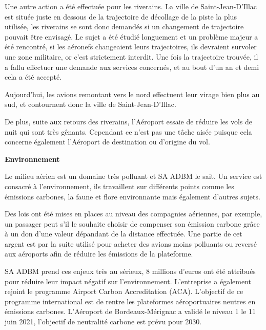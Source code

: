 Une autre action a été effectuée pour les riverains. La ville de Saint-Jean-D'Illac est située juste en dessous de la trajectoire de décollage de la piste la plus utilisée, les riverains se sont donc demandés si un changement de trajectoire pouvait être envisagé.
Le sujet a été étudié longuement et un problème majeur a été rencontré, si les aéronefs changeaient leurs trajectoires, ils devraient survoler une zone militaire, or c'est strictement interdit.
Une fois la trajectoire trouvée, il a fallu effectuer une demande aux services concernés, et au bout d'un an et demi cela a été accepté.\newline

Aujourd'hui, les avions remontant vers le nord effectuent leur virage bien plus au sud, et contournent donc la ville de Saint-Jean-D'Illac.\newline


De plus, suite aux retours des riverains, l'Aéroport essaie de réduire les vols de nuit qui sont très gênants. Cependant ce n'est pas une tâche aisée puisque cela concerne également l'Aéroport de destination ou d'origine du vol.


\textbf{Environnement}

Le milieu aérien est un domaine très polluant et SA ADBM le sait. Un service est consacré à l'environnement, ils travaillent sur différents points comme les émissions carbones, la faune et flore environnante mais également d'autres sujets.


Des lois ont été mises en places au niveau des compagnies aériennes, par exemple, un passager peut s'il le souhaite choisir de compenser son émission carbone grâce à un don d'une valeur dépandant de la distance effectuée.
Une partie de cet argent est par la suite utilisé pour acheter des avions moins polluants ou reversé aux aéroports afin de réduire les émissions de la plateforme.\newline

SA ADBM prend ces enjeux très au sérieux, 8 millions d'euros ont été attribués pour réduire leur impact négatif sur l'environnement.
L'entreprise a également rejoint le programme Airport Carbon Accreditation (ACA). L'objectif de ce programme international est de rentre les plateformes aéroportuaires neutres en émissions carbones.
L'Aéroport de Bordeaux-Mérignac a validé le niveau 1 le 11 juin 2021, l'objectif de neutralité carbone est prévu pour 2030.

